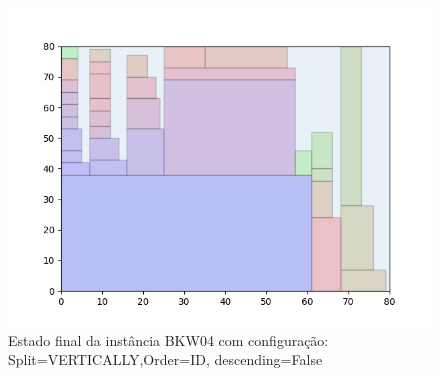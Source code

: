 \begin{figure}[H]
    \centering
    \caption[]{Estado final da instância BKW04 com configuração: Split=VERTICALLY,Order=ID, descending=False}
    \label{fig:bkw04-vertically-id-false}
    \includegraphics[scale=0.5]{output/figures/bkw/bkw04/vertically/id/false/00}
\end{figure}